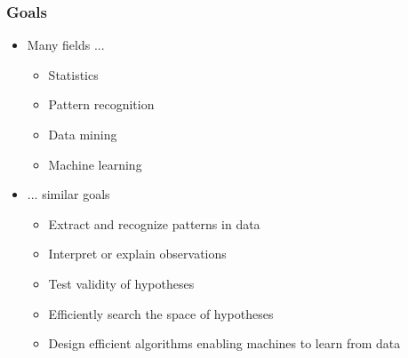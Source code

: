 \documentclass[xcolor=dvipsnames, 9pt]{beamer}
\begin{document}
\begin{frame}
  \frametitle{Goals}

  \begin{itemize}
    \item Many fields ...
      \begin{itemize}
        \item Statistics
        \item Pattern recognition
        \item Data mining
        \item Machine learning
      \end{itemize}
    \item ... similar goals
      \begin{itemize}
        \item Extract and recognize patterns in data
        \item Interpret or explain observations
        \item Test validity of hypotheses
        \item Efficiently search the space of hypotheses
        \item Design efficient algorithms enabling machines to learn from data
      \end{itemize}
  \end{itemize}

\end{frame}
\end{document}
